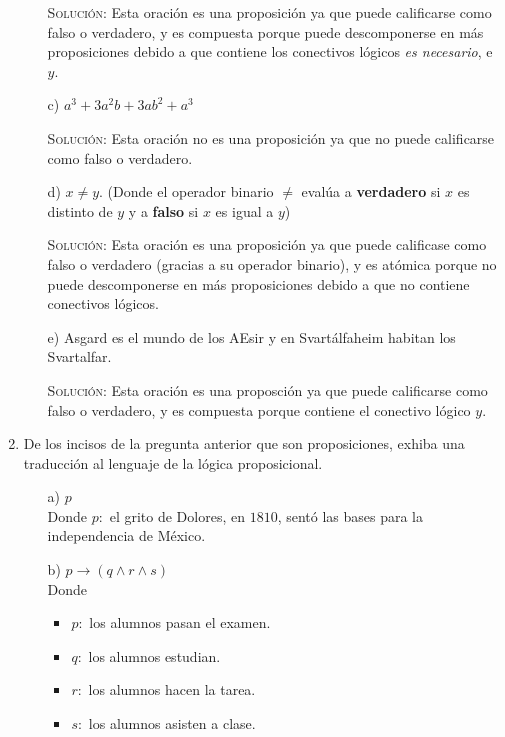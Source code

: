 \documentclass[letterpaper,11pt]{article}
\begin{document}
\begin{enumerate}
\begin{itemize}
        \textsc{Solución:} Esta oración es una proposición ya que puede 
        calificarse como falso o verdadero, y es compuesta porque puede 
        descomponerse en más proposiciones debido a que contiene los conectivos
        lógicos \textit{es necesario}, e $y$.

        \item[c)] $a^{3} + 3a^{2}b + 3ab^{2} + a^{3}$

        \textsc{Solución:} Esta oración no es una proposición ya que no puede 
        calificarse como falso o verdadero.

        \item[d)] $x \neq y$. (Donde el operador binario $\neq$ evalúa a 
        \textbf{verdadero} si $x$ es distinto de $y$ y a \textbf{falso} si 
        $x$ es igual a $y$)

        \textsc{Solución:} Esta oración es una proposición ya que puede 
        calificase como falso o verdadero (gracias a su operador binario), y es 
        atómica porque no puede descomponerse en más proposiciones debido a que 
        no contiene conectivos lógicos. 

        \item[e)] Asgard es el mundo de los AEsir y en Svartálfaheim habitan los 
        Svartalfar.

        \textsc{Solución:} Esta oración es una proposción ya que puede 
        calificarse como falso o verdadero, y es compuesta porque contiene el 
        conectivo lógico $y$. 
    \end{itemize}

    \item De los incisos de la pregunta anterior que son proposiciones, exhiba
    una traducción al lenguaje de la lógica proposicional.

    \begin{itemize}
        \item[a)] $p$ \\ 
        Donde $p:$ el grito de Dolores, en $1810$, sentó las bases para la 
        independencia de México.

        \item[b)] $p → (q \land r \land s)$ \\ 
        Donde 
        \begin{itemize}
            \item $p:$ los alumnos pasan el examen.
            \item $q:$ los alumnos estudian.
            \item $r:$ los alumnos hacen la tarea.
            \item $s:$ los alumnos asisten a clase.
        \end{itemize}
    

\end{itemize}
\end{enumerate}
\end{document}
